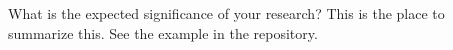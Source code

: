 What is the expected significance of your research? This is the place to summarize this. See the example in the repository.